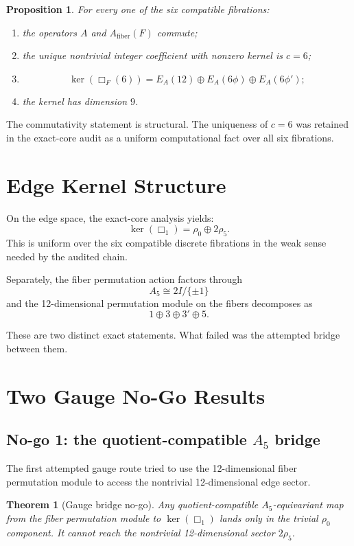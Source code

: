 \documentclass[12pt,a4paper]{article}
\newtheorem{theorem}{Theorem}
\newtheorem{proposition}{Proposition}
\theoremstyle{definition}
\begin{document}
\begin{proposition}
For every one of the six compatible fibrations:
\begin{enumerate}[label=\textup{(\alph*)}]
\item the operators \(A\) and \(A_{\mathrm{fiber}}(F)\) commute;
\item the unique nontrivial integer coefficient with nonzero kernel is
  \(c=6\);
\item
  \[
  \ker(\Box_F(6))
  =
  E_A(12)\oplus E_A(6\phi)\oplus E_A(6\phi');
  \]
\item the kernel has dimension \(9\).
\end{enumerate}
\end{proposition}

The commutativity statement is structural. The uniqueness of \(c=6\) was
retained in the exact-core audit as a uniform computational fact over all six
fibrations.

\section{Edge Kernel Structure}

On the edge space, the exact-core analysis yields:
\[
\ker(\Box_1)=\rho_0 \oplus 2\rho_5.
\]
This is uniform over the six compatible discrete fibrations in the weak sense
needed by the audited chain.

Separately, the fiber permutation action factors through
\[
A_5 \cong 2I/\{\pm 1\}
\]
and the 12-dimensional permutation module on the fibers decomposes as
\[
1 \oplus 3 \oplus 3' \oplus 5.
\]

These are two distinct exact statements. What failed was the attempted bridge
between them.

\section{Two Gauge No-Go Results}

\subsection{No-go 1: the quotient-compatible \(A_5\) bridge}

The first attempted gauge route tried to use the 12-dimensional fiber
permutation module to access the nontrivial 12-dimensional edge sector.

\begin{theorem}[Gauge bridge no-go]
Any quotient-compatible \(A_5\)-equivariant map from the fiber permutation
module to \(\ker(\Box_1)\) lands only in the trivial \(\rho_0\) component.
It cannot reach the nontrivial 12-dimensional sector \(2\rho_5\).
\end{theorem}
\end{document}
